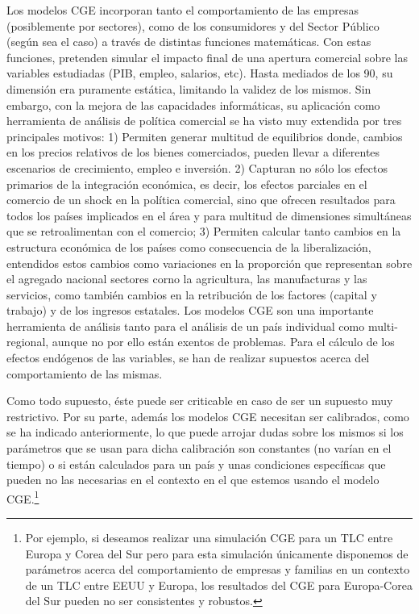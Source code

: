 \documentclass[10pt,a4paper]{article}
\begin{document}
{} Los modelos CGE incorporan tanto el comportamiento de las empresas (posiblemente por sectores), como de los consumidores y del Sector Público (según sea el caso) a través de distintas funciones matemáticas. Con estas funciones, pretenden simular el impacto final de una apertura comercial sobre las variables estudiadas (PIB, empleo, salarios, etc). Hasta mediados de los 90, su dimensión era puramente estática, limitando la validez de los mismos. Sin embargo, con la mejora de las capacidades informáticas, su aplicación como herramienta de análisis de política comercial se ha visto muy extendida por tres principales motivos: 1) Permiten generar multitud de equilibrios donde, cambios en los precios relativos de los bienes comerciados, pueden llevar a diferentes escenarios de crecimiento, empleo e inversión. 2) Capturan no sólo los efectos primarios de la integración económica, es decir, los efectos parciales en el comercio de un shock en la política comercial, sino que ofrecen resultados para todos los países implicados en el área y para multitud de dimensiones simultáneas que se retroalimentan con el comercio; 3) Permiten calcular tanto cambios en la estructura económica de los países como consecuencia de la liberalización, entendidos estos cambios como variaciones en la proporción que representan sobre el agregado nacional sectores corno la agricultura, las manufacturas y las servicios, como también cambios en la retribución de los factores (capital y trabajo) y de los ingresos estatales. Los modelos CGE son una importante herramienta de análisis tanto para el análisis de un país individual como multi-regional, aunque no por ello están exentos de problemas. Para el cálculo de los efectos endógenos de las variables, se han de realizar supuestos acerca del comportamiento de las mismas. 

Como todo supuesto, éste puede ser criticable en caso de ser un supuesto muy restrictivo. Por su parte, además los modelos CGE necesitan ser calibrados, como se ha indicado anteriormente, lo que puede arrojar dudas sobre los mismos si los parámetros que se usan para dicha calibración son constantes (no varían en el tiempo) o si están calculados para un país y unas condiciones específicas que pueden no las necesarias en el contexto en el que estemos usando el modelo CGE.\footnote{%
    Por ejemplo, si deseamos realizar una simulación CGE para un TLC entre Europa y Corea del Sur pero para esta simulación únicamente disponemos de parámetros acerca del comportamiento de empresas y familias en un contexto de un TLC entre EEUU y Europa, los resultados del CGE para Europa-Corea del Sur pueden no ser consistentes y
robustos.
} 
\end{document}
